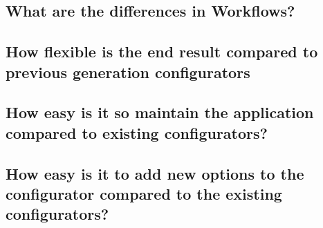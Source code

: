 \subsection{What are the differences in Workflows?}

\subsection{How flexible is the end result compared to previous generation configurators}

\subsection{How easy is it so maintain the application compared to existing configurators?}

\subsection{How easy is it to add new options to the configurator compared to the existing configurators?}


